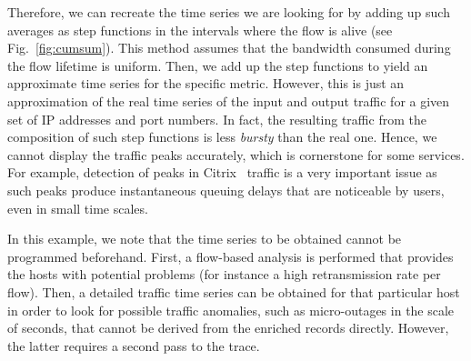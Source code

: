 \documentclass[AMA,STIX1COL]{WileyNJD-v2}
\begin{document}
Therefore, we can recreate the time series we are looking for by adding up such averages as step functions in the intervals where the flow is alive (see Fig.~\ref{fig:cumsum}). This method assumes that the bandwidth consumed during the flow lifetime is uniform.  Then, we add up the step functions to yield an approximate time series for the specific metric. However, this is just an approximation of the real time series of the input and output traffic for a given set of IP addresses and port numbers.
In fact, the resulting traffic from the composition of such step functions is less \textit{bursty} than the real one. Hence, we cannot display the traffic peaks accurately, which is cornerstone for some services. For example, detection of peaks in Citrix~\cite{CITRIX} traffic is a very important issue as such peaks produce instantaneous queuing delays that are noticeable by users, even in small time scales.

In this example, we note that the time series to be obtained cannot be programmed beforehand. First, a flow-based analysis is performed that provides the hosts with potential problems (for instance a high retransmission rate per flow). Then, a detailed traffic time series can be obtained for that particular host in order to look for possible traffic anomalies, such as micro-outages in the scale of seconds, that cannot be derived from the enriched records directly. However, the latter requires a second pass to the trace.   %
\end{document}
